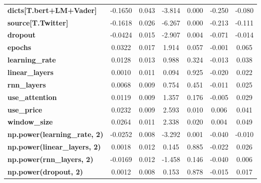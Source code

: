 \begin{center}
\begin{tabular}{lcccccc}
\textbf{dicts[T.bert+LM+Vader]}      &      -0.1650  &        0.043     &    -3.814  &         0.000        &       -0.250    &       -0.080     \\
\textbf{source[T.Twitter]}           &      -0.1618  &        0.026     &    -6.267  &         0.000        &       -0.213    &       -0.111     \\
\textbf{dropout}                     &      -0.0424  &        0.015     &    -2.907  &         0.004        &       -0.071    &       -0.014     \\
\textbf{epochs}                      &       0.0322  &        0.017     &     1.914  &         0.057        &       -0.001    &        0.065     \\
\textbf{learning\_rate}              &       0.0128  &        0.013     &     0.988  &         0.324        &       -0.013    &        0.038     \\
\textbf{linear\_layers}              &       0.0010  &        0.011     &     0.094  &         0.925        &       -0.020    &        0.022     \\
\textbf{rnn\_layers}                 &       0.0068  &        0.009     &     0.754  &         0.451        &       -0.011    &        0.025     \\
\textbf{use\_attention}              &       0.0119  &        0.009     &     1.357  &         0.176        &       -0.005    &        0.029     \\
\textbf{use\_price}                  &       0.0232  &        0.009     &     2.593  &         0.010        &        0.006    &        0.041     \\
\textbf{window\_size}                &       0.0264  &        0.011     &     2.338  &         0.020        &        0.004    &        0.049     \\
\textbf{np.power(learning\_rate, 2)} &      -0.0252  &        0.008     &    -3.292  &         0.001        &       -0.040    &       -0.010     \\
\textbf{np.power(linear\_layers, 2)} &       0.0018  &        0.012     &     0.145  &         0.885        &       -0.022    &        0.026     \\
\textbf{np.power(rnn\_layers, 2)}    &      -0.0169  &        0.012     &    -1.458  &         0.146        &       -0.040    &        0.006     \\
\textbf{np.power(dropout, 2)}        &       0.0012  &        0.008     &     0.153  &         0.878        &       -0.015    &        0.017     \\

\end{tabular}
\end{center}
